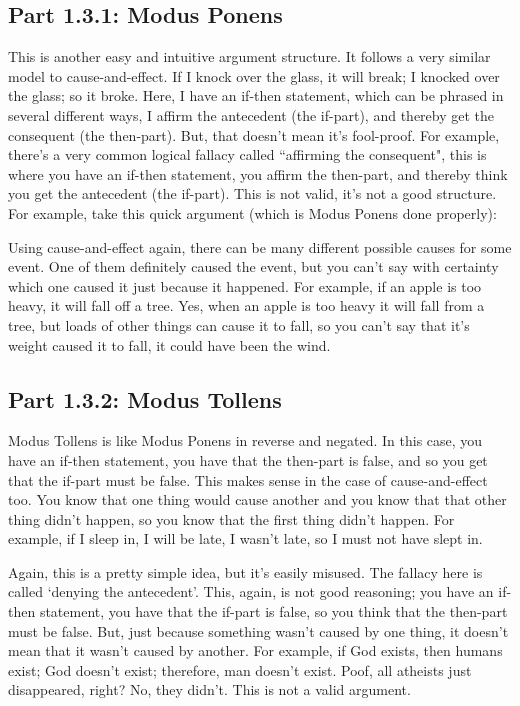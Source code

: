 \subsection{Part 1.3.1: Modus Ponens}
\label{s:p1.3.1}

This is another easy and intuitive argument structure. It follows a very similar model to cause-and-effect. If I knock over the glass, it will break; I knocked over the glass; so it broke. Here, I have an if-then statement, which can be phrased in several different ways, I affirm the antecedent (the if-part), and thereby get the consequent (the then-part). But, that doesn't mean it's fool-proof. For example, there's a very common logical fallacy called ``affirming the consequent", this is where you have an if-then statement, you affirm the then-part, and thereby think you get the antecedent (the if-part). This is not valid, it's not a good structure. For example, take this quick argument (which is Modus Ponens done properly):


Using cause-and-effect again, there can be many different possible causes for some event. One of them definitely caused the event, but you can't say with certainty which one caused it just because it happened. For example, if an apple is too heavy, it will fall off a tree. Yes, when an apple is too heavy it will fall from a tree, but loads of other things can cause it to fall, so you can't say that it's weight caused it to fall, it could have been the wind.

\subsection{Part 1.3.2: Modus Tollens}
\label{s:p1.3.2}

Modus Tollens is like Modus Ponens in reverse and negated. In this case, you have an if-then statement, you have that the then-part is false, and so you get that the if-part must be false. This makes sense in the case of cause-and-effect too. You know that one thing would cause another and you know that that other thing didn't happen, so you know that the first thing didn't happen. For example, if I sleep in, I will be late, I wasn't late, so I must not have slept in. 

Again, this is a pretty simple idea, but it's easily misused. The fallacy here is called `denying the antecedent'. This, again, is not good reasoning; you have an if-then statement, you have that the if-part is false, so you think that the then-part must be false. But, just because something wasn't caused by one thing, it doesn't mean that it wasn't caused by another. For example, if God exists, then humans exist; God doesn't exist; therefore, man doesn't exist. Poof, all atheists  just disappeared, right? No, they didn't. This is not a valid argument. 

